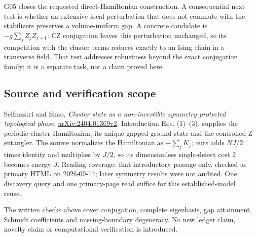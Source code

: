 \documentclass[11pt,a4paper]{article}
\begin{document}
G05 closes the requested direct-Hamiltonian construction. A
consequential next test is whether an extensive local perturbation that
does not commute with the stabilizers preserves a volume-uniform gap. A
concrete candidate is \(-g\sum_j Z_jZ_{j+1}\): CZ conjugation leaves
this perturbation unchanged, so its competition with the cluster terms
reduces exactly to an Ising chain in a transverse field. That test
addresses robustness beyond the exact conjugation family; it is a
separate task, not a claim proved here.

\hypertarget{source-and-verification-scope}{%
\subsection{Source and verification
scope}\label{source-and-verification-scope}}

Seifnashri and Shao, \emph{Cluster state as a non-invertible symmetry
protected topological phase},
\href{https://arxiv.org/html/2404.01369v2}{arXiv:2404.01369v2},
Introduction Eqs. (1)--(3), supplies the periodic cluster Hamiltonian,
its unique gapped ground state and the controlled-Z entangler. The
source normalizes the Hamiltonian as \(-\sum_jK_j\); ours adds \(NJ/2\)
times identity and multiplies by \(J/2\), so its dimensionless
single-defect cost 2 becomes energy \(J\). Reading coverage: that
introductory passage only, checked as primary HTML on 2026-09-14; later
symmetry results were not audited. One discovery query and one
primary-page read suffice for this established-model reuse.

The written checks above cover conjugation, complete eigenbasis, gap
attainment, Schmidt coefficients and missing-boundary degeneracy. No new
ledger claim, novelty claim or computational verification is introduced.
\end{document}
